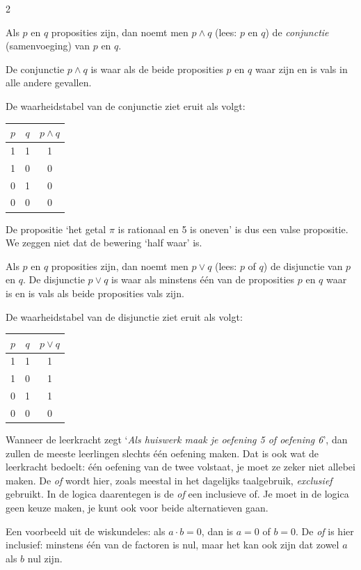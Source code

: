 \begin{multicols}{2}

Als $p$ en $q$ proposities zijn, dan noemt men $p \land q$ (lees: $p$ en $q$) de \emph{conjunctie} (samenvoeging) van $p$ en $q$.

De conjunctie $p\land q$ is waar als de beide proposities $p$ en $q$ waar zijn en is vals in alle andere gevallen.

De waarheidstabel van de conjunctie ziet eruit als volgt:
\begin{center}
\begin{tabular}{c|c|c}  
$p$ & $q$ & $p\land q$\\
\hline
1 & 1 & 1 \\
1 & 0 & 0\\
0 & 1 & 0\\
0 & 0 & 0
\end{tabular}
\end{center}

De propositie `het getal $\pi$ is rationaal en 5 is oneven' is dus een valse propositie. We zeggen niet dat de bewering `half waar' is.


Als $p$ en $q$ proposities zijn, dan noemt men $p \lor q$ (lees: $p$ of $q$) de disjunctie van $p$ en $q$. De disjunctie $p\lor q$ is waar als minstens \'e\'en van de proposities $p$ en $q$ waar is en is vals als beide proposities vals zijn.

De waarheidstabel van de disjunctie ziet eruit als volgt:
\begin{center}
\begin{tabular}{c|c|c}  
$p$ & $q$ & $p\lor q$\\
\hline
1 & 1 & 1 \\
1 & 0 & 1\\
0 & 1 & 1\\
0 & 0 & 0
\end{tabular}
\end{center}


Wanneer de leerkracht zegt `\emph{Als huiswerk maak je oefening 5 of oefening 6}', dan zullen de meeste leerlingen slechts één oefening maken. Dat is ook wat de leerkracht bedoelt: één oefening van de twee volstaat, je moet ze zeker niet allebei maken. De \emph{of} wordt hier, zoals meestal in het dagelijks taalgebruik, \emph{exclusief} gebruikt. In de logica daarentegen is de \emph{of} een inclusieve of. Je moet in de logica geen keuze maken, je kunt ook voor beide alternatieven gaan.

Een voorbeeld uit de wiskundeles: als $a\cdot b = 0$, dan is $a = 0$ of $b = 0$. De \emph{of} is hier inclusief: minstens één van de factoren is nul, maar het kan ook zijn dat zowel $a$ als $b$ nul zijn.


\end{multicols}
